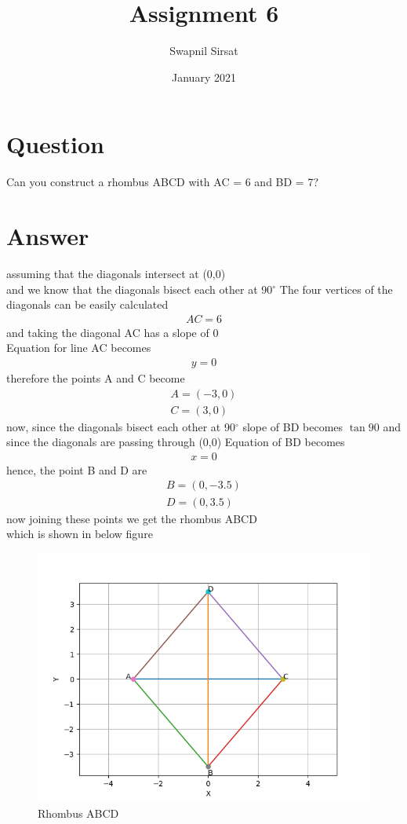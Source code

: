 \documentclass{article}
\title{Assignment 6}
\author{Swapnil Sirsat }
\date{January 2021}
\begin{document}
\maketitle

\section*{Question}
Can you construct a rhombus ABCD with
AC = 6 and BD = 7?
\section*{Answer}
assuming that the diagonals intersect at (0,0) \\
and we know that the diagonals bisect each other at 90$^\circ$
The four vertices of the diagonals can be easily calculated\\
\begin{gather*}
    AC = 6
\end{gather*}
and taking the diagonal AC has a slope of 0 \\
Equation for line AC becomes\\
\begin{gather*}
    y = 0
\end{gather*}
therefore the points A and C become
\begin{gather*}
    A = (-3,0)\\
    C = (3,0)
\end{gather*}
now, since the diagonals bisect each other at 90$^\circ$
slope of BD becomes $\tan{90}$ and since the diagonals are passing through (0,0)
Equation of BD becomes 
\begin{gather*}
    x = 0
\end{gather*}
hence, the point B and D are
\begin{gather*}
    B = (0,-3.5)\\
    D = (0,3.5)
\end{gather*}
\newpage
now joining these points we get the rhombus ABCD
\\ which is shown in below figure

\begin{figure}[h!]
    \centering
    \includegraphics{Figure_3.png}
    \caption{Rhombus ABCD}
    \label{fig:my_label}
\end{figure}
\newpage
\end{document}
